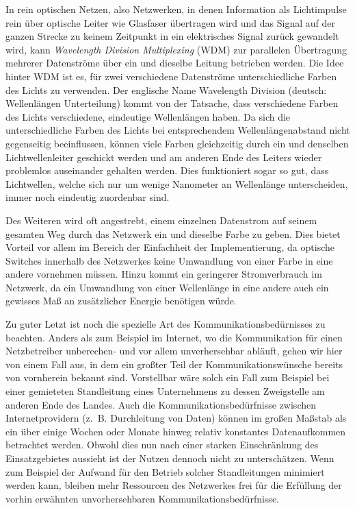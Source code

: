 In rein optischen Netzen, also Netzwerken, in denen Information als Lichtimpulse rein über optische Leiter wie Glasfaser übertragen wird und das Signal auf der ganzen Strecke zu keinem Zeitpunkt in ein elektrisches Signal zurück gewandelt wird, kann \textit{Wavelength Division Multiplexing} (WDM) zur parallelen Übertragung mehrerer Datenströme über ein und dieselbe Leitung betrieben werden. Die Idee hinter WDM ist es, für zwei verschiedene Datenströme unterschiedliche Farben des Lichts zu verwenden. Der englische Name Wavelength Division (deutsch: Wellenlängen Unterteilung) kommt von der Tatsache, dass verschiedene Farben des Lichts verschiedene, eindeutige Wellenlängen haben. Da sich die unterschiedliche Farben des Lichts bei entsprechendem Wellenlängenabstand nicht gegenseitig beeinflussen, können viele Farben gleichzeitig durch ein und denselben Lichtwellenleiter geschickt werden und am anderen Ende des Leiters wieder problemlos auseinander gehalten werden. Dies funktioniert sogar so gut, dass Lichtwellen, welche sich nur um wenige Nanometer an Wellenlänge unterscheiden, immer noch eindeutig zuordenbar sind.

Des Weiteren wird oft angestrebt, einem einzelnen Datenstrom auf seinem gesamten Weg durch das Netzwerk ein und dieselbe Farbe zu geben. Dies bietet Vorteil vor allem im Bereich der Einfachheit der Implementierung, da optische Switches innerhalb des Netzwerkes keine Umwandlung von einer Farbe in eine andere vornehmen müssen. Hinzu kommt ein geringerer Stromverbrauch im Netzwerk, da ein Umwandlung von einer Wellenlänge in eine andere auch ein gewisses Maß an zusätzlicher Energie benötigen würde.

Zu guter Letzt ist noch die spezielle Art des Kommunikationsbedürnisses zu beachten. Anders als zum Beispiel im Internet, wo die Kommunikation für einen Netzbetreiber unberechen- und vor allem unverhersehbar abläuft, gehen wir hier von einem Fall aus, in dem ein großter Teil der Kommunikationswünsche bereits von vornherein bekannt sind. Vorstellbar wäre solch ein Fall zum Beispiel bei einer gemieteten Standleitung eines Unternehmens zu dessen Zweigstelle am anderen Ende des Landes. Auch die Kommunikationsbedürfnisse zwischen Internetprovidern (z.\ B. Durchleitung von Daten) können im großen Maßstab als ein über einige Wochen oder Monate hinweg relativ konstantes Datenaufkommen betrachtet werden. Obwohl dies nun nach einer starken Einschränkung des Einsatzgebietes aussieht ist der Nutzen dennoch nicht zu unterschätzen. Wenn zum Beispiel der Aufwand für den Betrieb solcher Standleitungen minimiert werden kann, bleiben mehr Ressourcen des Netzwerkes frei für die Erfüllung der vorhin erwähnten unvorhersehbaren Kommunikationsbedürfnisse.

